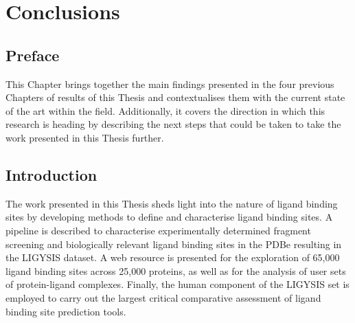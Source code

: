 \chapter{Conclusions}

\section*{Preface}

This Chapter brings together the main findings presented in the four previous Chapters of results of this Thesis and contextualises them with the current state of the art within the field. Additionally, it covers the direction in which this research is heading by describing the next steps that could be taken to take the work presented in this Thesis further.

\section{Introduction}


The work presented in this Thesis sheds light into the nature of ligand binding sites by developing methods to define and characterise ligand binding sites. A pipeline is described to characterise experimentally determined fragment screening and biologically relevant ligand binding sites in the PDBe resulting in the LIGYSIS dataset. A web resource is presented for the exploration of 65,000 ligand binding sites across 25,000 proteins, as well as for the analysis of user sets of protein-ligand complexes. Finally, the human component of the LIGYSIS set is employed to carry out the largest critical comparative assessment of ligand binding site prediction tools.

